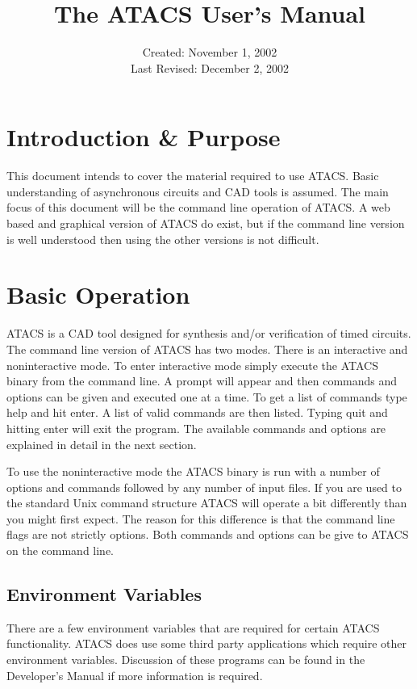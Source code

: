 \documentclass[titlepage,11pt]{article}
\title{The ATACS User's Manual}
\date{Created: November 1, 2002\\
  Last Revised: December 2, 2002
}
\begin{document}
  \maketitle

  \setcounter{tocdepth}{2} 
  
  \tableofcontents
  \newpage
  
  \setlength{\parindent}{0em}
  \setlength{\parskip}{10pt}

  \section{Introduction \& Purpose}  
  This document intends to cover the material required to use ATACS.
  Basic understanding of asynchronous circuits and CAD tools is
  assumed.  The main focus of this document will be the command line
  operation of ATACS.  A web based and graphical version of ATACS do
  exist, but if the command line version is well understood then using
  the other versions is not difficult.
  
  \section{Basic Operation}
  ATACS is a CAD tool designed for synthesis and/or verification of
  timed circuits.  The command line version of ATACS has two modes.
  There is an interactive and noninteractive mode.  To enter
  interactive mode simply execute the ATACS binary from the command
  line.  A prompt will appear and then commands and options can be
  given and executed one at a time.  To get a list of commands type
  help and hit enter.   A list of valid commands are then listed.
  Typing quit and hitting enter will exit the program.  The available
  commands and options are explained in detail in the next section.

  To use the noninteractive mode the ATACS binary is run with a number
  of options and commands followed by any number of input files.  If
  you are used to the standard Unix command structure ATACS will
  operate a bit differently than you might first expect.  The reason
  for this difference is that the command line flags are not strictly
  options.  Both commands and options can be give to ATACS on the
  command line.

  \subsection{Environment Variables}
  There are a few environment variables that are required for certain
  ATACS functionality.  ATACS does use some third party applications
  which require other environment variables.  Discussion of these
  programs can be found in the Developer's Manual if more information
  is required.
\end{document}
